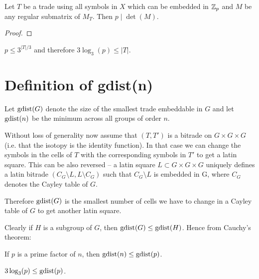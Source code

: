 \begin{lem}
Let $T$ be a trade using all symbols in $X$ which can be embedded in $\mathbb Z_p$ and $M$ be any regular submatrix of $M_T$. Then $p \mid \det(M)$.
\end{lem}
\begin{proof}
\end{proof}

\begin{cor}
$p \leq 3^{|T|/3}$ and therefore $3 \log_3(p) \leq |T|$.
\end{cor}%


\section{Definition of gdist(n)}

\begin{defn}
Let \emph{$\mathop{\mathrm{gdist}}(G)$} denote the size of the smallest trade embeddable in $G$ and let \emph{$\mathop{\mathrm{gdist}}(n)$} be the minimum across all groups of order $n$.
\end{defn}

Without loss of generality now assume that $(T,T')$ is a bitrade on $G \times G \times G$  (i.e. that the isotopy is the identity function). In that case we can change the symbols in the cells of $T$ with the corresponding symbols in $T'$ to get a latin square. This can be also reversed -- a latin square $L \subset G \times G \times G$ uniquely defines a latin bitrade $(C_G\setminus L, L\setminus C_G)$ such that $C_G\setminus L$ is embedded in G, where $C_G$ denotes the Cayley table of $G$.

Therefore $\mathop{\mathrm{gdist}}(G)$ is the smallest number of cells we have to change in a Cayley table of $G$ to get another latin square.


Clearly if $H$ is a subgroup of $G$, then $\mathop{\mathrm{gdist}}(G) \leq \mathop{\mathrm{gdist}}(H)$. Hence from Cauchy's theorem:

\begin{lem}
\label{lem:gdist-n-leq-gdist-p}
If $p$ is a prime factor of $n$, then $\mathop{\mathrm{gdist}}(n) \leq \mathop{\mathrm{gdist}}(p)$.
\end{lem}%

\begin{lem}
$3\log_3(p) \leq \mathop{\mathrm{gdist}}(p)$.
\end{lem}%

